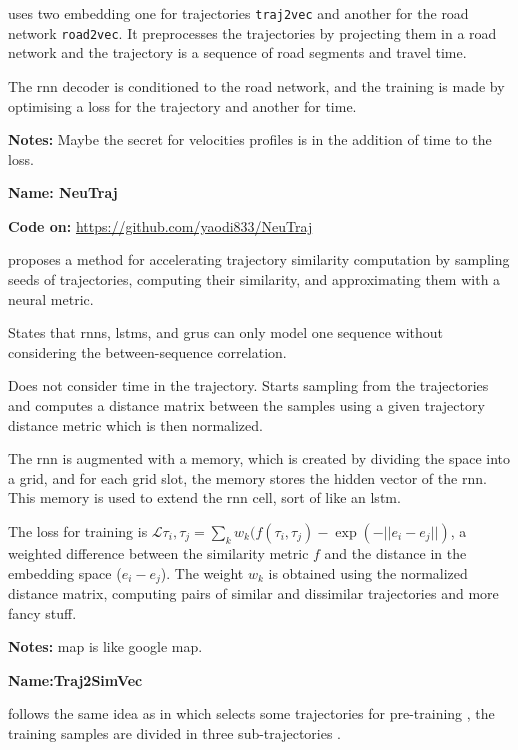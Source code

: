 \cite{fu2020trembr} uses two embedding one for trajectories \texttt{traj2vec} and another for the road network \texttt{road2vec}. It preprocesses the trajectories by projecting them in a road network and the trajectory is a sequence of road segments and travel time.

The \gls{rnn} decoder is conditioned to the road network, and the training is made by optimising a loss for the trajectory and another for time.

\textbf{Notes:} Maybe the secret for velocities profiles is in the addition of time to the loss.


\textbf{Name: NeuTraj}

\textbf{Code on:} \url{https://github.com/yaodi833/NeuTraj}

\cite{yao2019computing} proposes a method for accelerating trajectory similarity computation by sampling seeds of trajectories, computing their similarity, and approximating them with a neural metric.

States that \glspl{rnn}, \glspl{lstm}, and \glspl{gru} can only  model one sequence without considering the between-sequence correlation.

Does not consider time in the trajectory. Starts sampling from the trajectories and computes a distance matrix between the samples using a given trajectory distance metric which is then normalized.

The \gls{rnn} is augmented with a memory, which is created by dividing the space into a grid, and for each grid slot, the memory stores the hidden vector of the \gls{rnn}. This memory is used to extend the \gls{rnn} cell, sort of like an \gls{lstm}.

The loss for training is $\mathcal{L}{\tau_i, \tau_j}=\sum_k w_k(f(\tau_i, \tau_j)-\exp(-||e_i-e_j||)$, a weighted difference between the similarity metric $f$ and the distance in the embedding space ($e_i-e_j$). The weight $w_k$ is obtained using the normalized distance matrix, computing pairs of similar and dissimilar trajectories and more fancy stuff.

\textbf{Notes:} map is like google map.


\textbf{Name:Traj2SimVec}

\cite{zhang2020trajectory} follows the same idea as in \cite{yao2019computing} which selects some trajectories for pre-training , the training samples are divided in three sub-trajectories .

